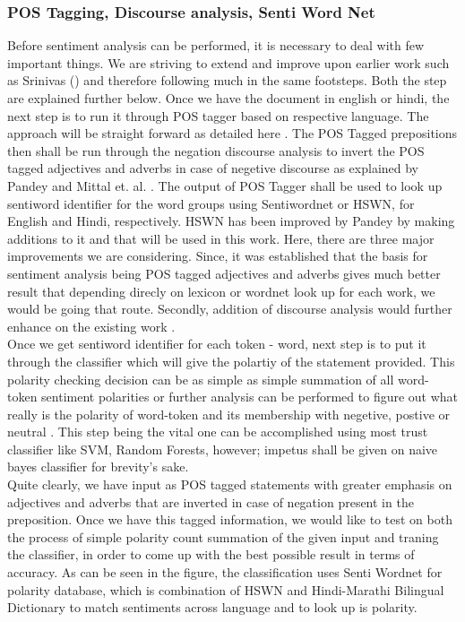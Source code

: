 \documentclass[12pt]{article}
\begin{document}
\subsubsection{POS Tagging, Discourse analysis, Senti Word Net}
\fontsize{12}{20}\selectfont Before sentiment analysis can be performed, it is necessary to deal with few
important things. We are striving to extend and improve upon earlier work such
as Srinivas (\cite{sharma_text_2015}) and therefore following much in the same
footsteps. Both the step are explained further below.
Once we have the document in english or hindi, the next step is to run it
through POS tagger based on respective language. The approach will be straight
forward as detailed here \cite{vyas_pos_2014}. The POS Tagged prepositions
then shall be run through the negation discourse analysis to invert the POS
tagged adjectives and adverbs in case of negetive discourse as explained by Pandey
\cite{pandey_framework_2015} and Mittal et. al. \cite{mittal_sentiment_2013}.
The output of POS Tagger shall be used to look up sentiword identifier for the
word groups using Sentiwordnet or HSWN, for English and Hindi, respectively.
HSWN has been improved by Pandey \cite{pandey_framework_2015} by making
additions to it and that will be used in this work. Here, there are three major
improvements we are considering. Since, it was established
\cite{shashank_sharma_sentiment_????} that the basis for sentiment analysis
being POS tagged adjectives and adverbs gives much better result that depending
direcly on lexicon or wordnet look up for each work, we would be going that
route. Secondly, addition of discourse analysis would further enhance on the
existing work \cite{shashank_sharma_sentiment_????}.\\

\fontsize{12}{20}\selectfont Once we get sentiword identifier for each token - word, next step is to put it
through the classifier which will give the polartiy of the statement provided.
This polarity checking decision can be as simple as simple summation of all
word-token sentiment polarities or further analysis can be performed to figure
out what really is the polarity of word-token and its membership with negetive,
postive or neutral . This step being the vital one can be accomplished using
most trust classifier like SVM, Random Forests, however; impetus shall be given
on naive bayes classifier for brevity's sake. \\
\fontsize{12}{20}\selectfont Quite clearly, we have input as POS tagged statements with greater emphasis on
adjectives and adverbs that are inverted in case of negation present in the
preposition. Once we have this tagged information, we would like to test on
both the process of simple polarity count summation of the given input and
traning the classifier, in order to come up with the best possible result in
terms of accuracy. As can be seen in the figure, the classification uses
Senti Wordnet for polarity database, which is combination of HSWN and
Hindi-Marathi Bilingual Dictionary to match sentiments across language and to
look up is polarity.\\
\end{document}

